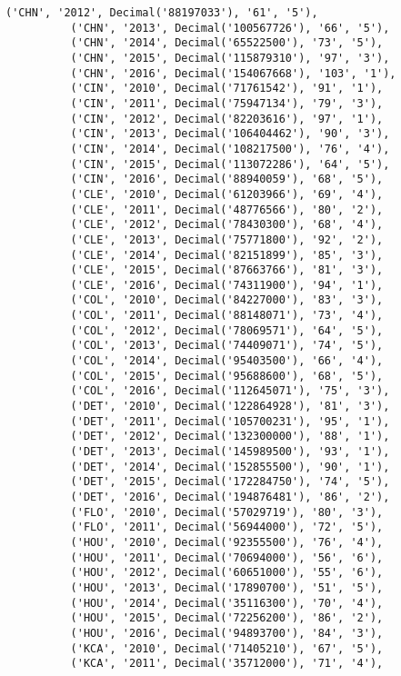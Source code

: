 \documentclass[11pt]{article}
\begin{document}
\begin{Verbatim}[commandchars=\\\{\}]
          ('CHN', '2012', Decimal('88197033'), '61', '5'),
          ('CHN', '2013', Decimal('100567726'), '66', '5'),
          ('CHN', '2014', Decimal('65522500'), '73', '5'),
          ('CHN', '2015', Decimal('115879310'), '97', '3'),
          ('CHN', '2016', Decimal('154067668'), '103', '1'),
          ('CIN', '2010', Decimal('71761542'), '91', '1'),
          ('CIN', '2011', Decimal('75947134'), '79', '3'),
          ('CIN', '2012', Decimal('82203616'), '97', '1'),
          ('CIN', '2013', Decimal('106404462'), '90', '3'),
          ('CIN', '2014', Decimal('108217500'), '76', '4'),
          ('CIN', '2015', Decimal('113072286'), '64', '5'),
          ('CIN', '2016', Decimal('88940059'), '68', '5'),
          ('CLE', '2010', Decimal('61203966'), '69', '4'),
          ('CLE', '2011', Decimal('48776566'), '80', '2'),
          ('CLE', '2012', Decimal('78430300'), '68', '4'),
          ('CLE', '2013', Decimal('75771800'), '92', '2'),
          ('CLE', '2014', Decimal('82151899'), '85', '3'),
          ('CLE', '2015', Decimal('87663766'), '81', '3'),
          ('CLE', '2016', Decimal('74311900'), '94', '1'),
          ('COL', '2010', Decimal('84227000'), '83', '3'),
          ('COL', '2011', Decimal('88148071'), '73', '4'),
          ('COL', '2012', Decimal('78069571'), '64', '5'),
          ('COL', '2013', Decimal('74409071'), '74', '5'),
          ('COL', '2014', Decimal('95403500'), '66', '4'),
          ('COL', '2015', Decimal('95688600'), '68', '5'),
          ('COL', '2016', Decimal('112645071'), '75', '3'),
          ('DET', '2010', Decimal('122864928'), '81', '3'),
          ('DET', '2011', Decimal('105700231'), '95', '1'),
          ('DET', '2012', Decimal('132300000'), '88', '1'),
          ('DET', '2013', Decimal('145989500'), '93', '1'),
          ('DET', '2014', Decimal('152855500'), '90', '1'),
          ('DET', '2015', Decimal('172284750'), '74', '5'),
          ('DET', '2016', Decimal('194876481'), '86', '2'),
          ('FLO', '2010', Decimal('57029719'), '80', '3'),
          ('FLO', '2011', Decimal('56944000'), '72', '5'),
          ('HOU', '2010', Decimal('92355500'), '76', '4'),
          ('HOU', '2011', Decimal('70694000'), '56', '6'),
          ('HOU', '2012', Decimal('60651000'), '55', '6'),
          ('HOU', '2013', Decimal('17890700'), '51', '5'),
          ('HOU', '2014', Decimal('35116300'), '70', '4'),
          ('HOU', '2015', Decimal('72256200'), '86', '2'),
          ('HOU', '2016', Decimal('94893700'), '84', '3'),
          ('KCA', '2010', Decimal('71405210'), '67', '5'),
          ('KCA', '2011', Decimal('35712000'), '71', '4'),

\end{Verbatim}
\end{document}
